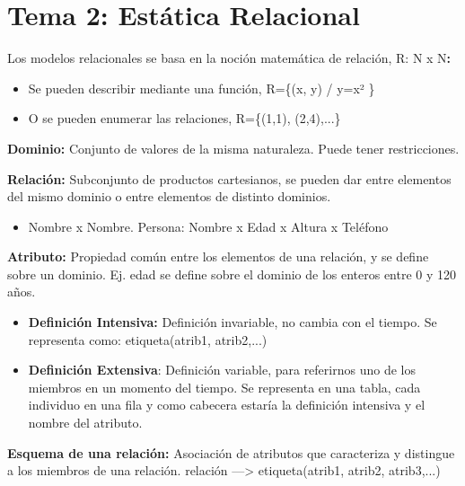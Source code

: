 \documentclass[12pt, twoside, openright]{report} %
\begin{document}
\chapter{Tema 2: Estática Relacional}


  
  Los modelos relacionales se basa en la noción matemática de relación, R:
  N x N\textbf{:}
  

  \begin{itemize}
  \item Se pueden describir mediante una función, R=\{(x, y) / y=x² \}
    
  \item O se pueden enumerar las relaciones, R=\{(1,1), (2,4),...\}
    
  \end{itemize}
  
  \textbf{Dominio:} Conjunto de valores de la misma naturaleza. Puede
  tener restricciones.
  
  
  \textbf{Relación:} Subconjunto de productos cartesianos, se pueden dar
  entre elementos del mismo dominio o entre elementos de distinto
  dominios.
  

  \begin{itemize}
  \item Nombre x Nombre. Persona: Nombre x Edad x Altura x Teléfono
    
  \end{itemize}

  
  \textbf{Atributo:} Propiedad común entre los elementos de una
  relación, y se define sobre un dominio. Ej. edad se define sobre el
  dominio de los enteros entre 0 y 120 años.
  

  \begin{itemize}
  \item \textbf{Definición Intensiva:} Definición invariable, no cambia con
    el tiempo. Se representa como: etiqueta(atrib1, atrib2,...)
    
  \item \textbf{Definición Extensiva}: Definición variable, para referirnos
    uno de los miembros en un momento del tiempo. Se representa en una
    tabla, cada individuo en una fila y como cabecera estaría la
    definición intensiva y el nombre del atributo.
    
  \end{itemize}

  
  \textbf{Esquema de una relación:} Asociación de atributos que
  caracteriza y distingue a los miembros de una relación. relación
  ---\textgreater{} etiqueta(atrib1, atrib2, atrib3,...)
  
\end{document}
